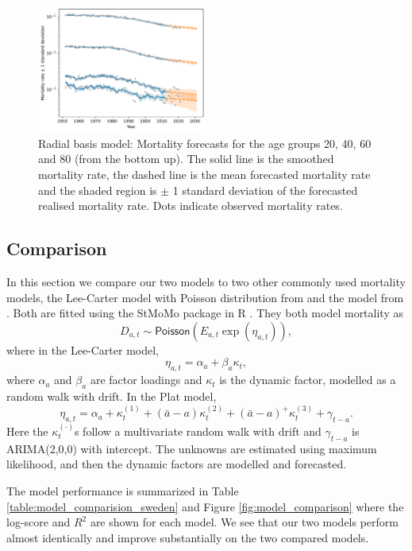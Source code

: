 \documentclass[11pt]{article}
\newcommand{\pa}[1]{\left(#1\right)}
\begin{document}
\begin{figure}
    \centering
    \includegraphics[width=0.5\textwidth]{figs/sweden_radial_basis_1952_2011_Male_100_15_4rateVsTime.pdf}
    \caption{Radial basis model: Mortality forecasts for the age groups 20, 40, 60 and 80 (from the bottom up). The solid line is the smoothed mortality rate, the dashed line is the mean forecasted mortality rate and the shaded region is $\pm$ 1 standard deviation of the forecasted realised mortality rate. Dots indicate observed mortality rates.}\label{fig:radial_model_forecast_sweden}
\end{figure}

\subsection{Comparison}
In this section we compare our two models to two other commonly used mortality models, the Lee-Carter model with Poisson distribution from \cite{brouhns2002poisson} and the model from \cite{plat2009stochastic}. Both are fitted using the StMoMo package in \textsf{R} \citep{stmomo2018}. They both model mortality as
$$
D_{a,t}\sim \mathsf{Poisson}(E_{a,t}\exp\pa{\eta_{a,t}}),
$$
where in the Lee-Carter model,
$$
\eta_{a,t} = \alpha_a + \beta_a \kappa_t,
$$
where $\alpha_a$ and $\beta_a$ are factor loadings and $\kappa_t$ is the dynamic factor, modelled as a random walk with drift. In the Plat model,
$$
\eta_{a,t} = \alpha_a + \kappa_t^{(1)} + (\bar a - a)\kappa_t^{(2)} + (\bar a - a)^+\kappa_t^{(3)} + \gamma_{t-a}.
$$
Here the $\kappa_t^{(\cdot)}$s follow a multivariate random walk with drift and $\gamma_{t-a}$ is ARIMA(2,0,0) with intercept. The unknowns are estimated using maximum likelihood, and then the dynamic factors are modelled and forecasted. 

The model performance is summarized in Table \ref{table:model_comparision_sweden} and Figure \ref{fig:model_comparison} where the log-score and $R^2$ are shown for each model. We see that our two models perform almost identically and improve substantially on the two compared models.
\end{document}
